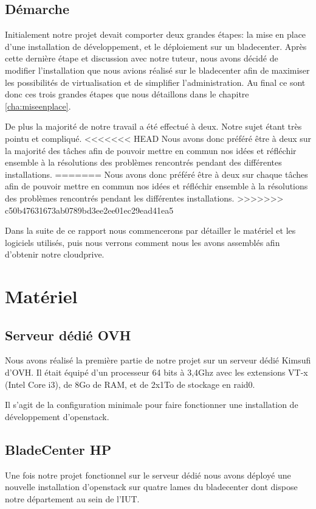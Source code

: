 \documentclass[a4paper,oneside]{report}
\begin{document}
\section{Démarche}
Initialement notre projet devait comporter deux grandes étapes: la mise en place d'une installation de développement, et le déploiement sur un \gls{bladecenter}. Après cette dernière étape et discussion avec notre tuteur, nous avons décidé de modifier l'installation que nous avions réalisé sur le \gls{bladecenter} afin de maximiser les possibilités de \gls{virtualisation} et de simplifier l'administration.\newline
Au final ce sont donc ces trois grandes étapes que nous détaillons dans le chapitre \ref{cha:miseenplace}.

De plus la majorité de notre travail a été effectué à deux.
Notre sujet étant très pointu et compliqué. 
<<<<<<< HEAD
Nous avons donc préféré être à deux sur la majorité des tâches afin de pouvoir mettre en commun nos idées et réfléchir ensemble à la résolutions des problèmes rencontrés pendant des différentes installations.
=======
Nous avons donc préféré être à deux sur chaque tâches afin de pouvoir mettre en commun nos idées et réfléchir ensemble à la résolutions des problèmes rencontrés pendant les différentes installations.
>>>>>>> c50b47631673ab0789bd3ee2ee01ec29ead41ea5

Dans la suite de ce rapport nous commencerons par détailler le matériel et les logiciels utilisés, puis nous verrons comment nous les avons assemblés afin d'obtenir notre \gls{cloudprive}.


\chapter{Matériel}

\section{Serveur dédié OVH}
Nous avons réalisé la première partie de notre projet sur un serveur dédié Kimsufi d'OVH.
Il était équipé d'un processeur 64 bits à 3,4Ghz avec les extensions VT-x (Intel Core i3), de 8Go de RAM, et de 2x1To de stockage en \gls{raid0}.

Il s'agit de la configuration minimale pour faire fonctionner une installation de développement d'\gls{openstack}.

\section{BladeCenter HP}
Une fois notre projet fonctionnel sur le serveur dédié nous avons déployé une nouvelle installation d'\gls{openstack} sur quatre lames du \gls{bladecenter} dont dispose notre département au sein de l'IUT.
\end{document}
